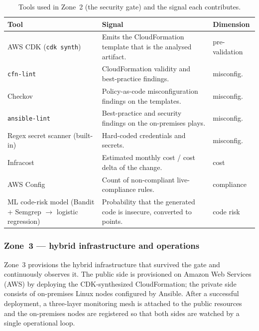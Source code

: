 \begin{table}[ht]
\centering
\caption{Tools used in Zone~2 (the security gate) and the signal each contributes.}
\label{tab:zone2-tools}
\begin{tabular}{|L{3.7cm}|L{7.0cm}|L{3.1cm}|}
\hline
\textbf{Tool} & \textbf{Signal} & \textbf{Dimension} \\
\hline
AWS CDK (\texttt{cdk synth}) & Emits the CloudFormation template that is the analysed
artifact. & pre-validation \\
\hline
\texttt{cfn-lint} & CloudFormation validity and best-practice findings. & misconfig. \\
\hline
Checkov & Policy-as-code misconfiguration findings on the templates. & misconfig. \\
\hline
\texttt{ansible-lint} & Best-practice and security findings on the on-premises plays. &
misconfig. \\
\hline
Regex secret scanner (built-in) & Hard-coded credentials and secrets. & misconfig. \\
\hline
Infracost & Estimated monthly cost / cost delta of the change. & cost \\
\hline
AWS Config & Count of non-compliant live-compliance rules. & compliance \\
\hline
ML code-risk model \newline (Bandit + Semgrep $\rightarrow$ logistic regression) &
Probability that the generated code is insecure, converted to points. & code risk \\
\hline
\end{tabular}
\end{table}

\subsubsection{Zone~3 --- hybrid infrastructure and operations}
\label{subsubsec:zone3}

Zone~3 provisions the hybrid infrastructure that survived the gate and continuously
observes it. The public side is provisioned on Amazon Web Services (AWS) by deploying the
CDK-synthesized CloudFormation; the private side consists of on-premises Linux nodes
configured by Ansible. After a successful deployment, a three-layer monitoring mesh is
attached to the public resources and the on-premises nodes are registered so that both
sides are watched by a single operational loop.

